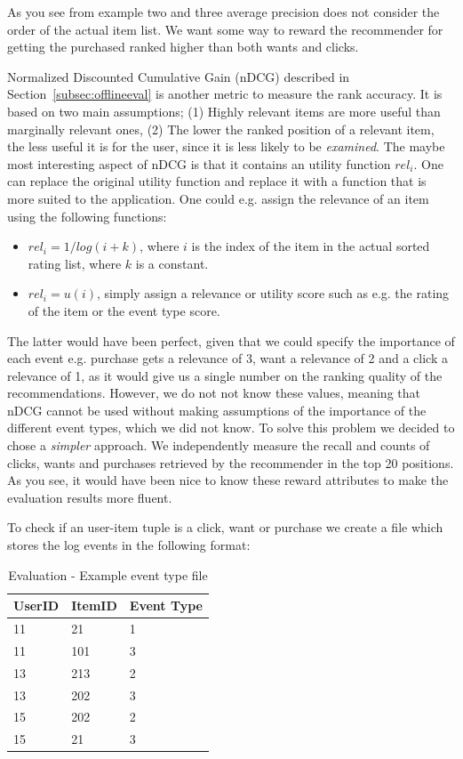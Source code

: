 As you see from example two and three average precision does not consider the order of the actual item list. We want some way to
reward the recommender for getting the purchased ranked higher than both wants and clicks.

Normalized Discounted Cumulative Gain (nDCG) described in Section~\ref{subsec:offlineeval} is another metric to
measure the rank accuracy. It is based on two main assumptions; (1) Highly relevant items are more useful than marginally relevant ones,
(2) The lower the ranked position of a relevant item, the less useful it is for the user, since it is less likely to be \emph{examined}.
The maybe most interesting aspect of nDCG is that it contains an utility function $rel_i$. One can replace the original utility function
and replace it with a function that is more suited to the application. One could e.g. assign the relevance of an item using
the following functions:

\begin{itemize}
\item $rel_i = 1/log(i+k)$, where $i$ is the index of the item in the actual sorted rating list, where $k$ is a constant.
\item $rel_i = u(i)$, simply assign a relevance or utility score such as e.g. the rating of the item or the event type score.
\end{itemize}

The latter would have been perfect, given that we could specify the importance of each event e.g. purchase gets a relevance of 3, want
a relevance of 2 and a click a relevance of 1, as it would give us a single number on the ranking quality of the recommendations.
However, we do not not know these values, meaning that nDCG cannot be used without making assumptions of the importance of the different
event types, which we did not know. To solve this problem we decided to chose a \emph{simpler} approach. We independently measure the recall
and counts of clicks, wants and purchases retrieved by the recommender in the top 20 positions. As you see, it would have been nice to know these
reward attributes to make the evaluation results more fluent.

To check if an user-item tuple is a click, want or purchase we create a file which
stores the log events in the following format:

\begin{table}[H]
\centering
\begin{tabular}{*{3}l}
\toprule
UserID	&	ItemID	 &  Event Type  \\ \midrule
11		&	21		 &	1			\\
11		&	101		 &	3			\\
13		&	213		 &	2			\\
13		&	202		 &  3			\\
15		&	202		 &  2			\\
15		&	21		 &  3			\\
\bottomrule
\end{tabular}
\caption{Evaluation - Example event type file}
\label{table:event-type}
\end{table}

